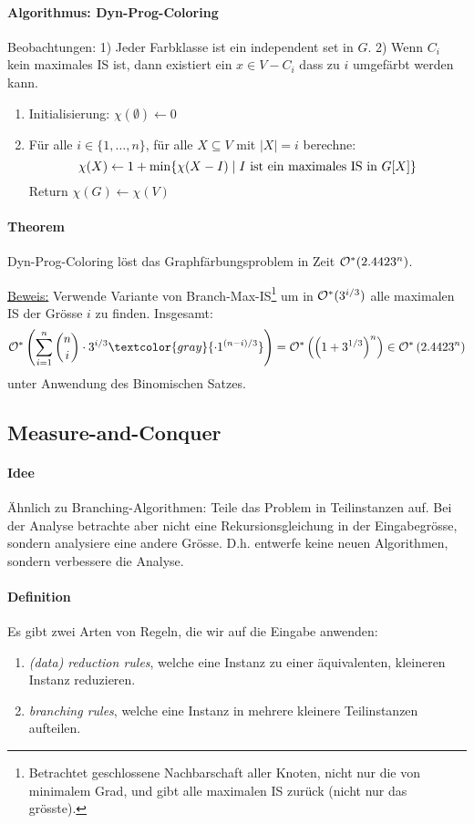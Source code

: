 \paragraph{Algorithmus: Dyn-Prog-Coloring}
Beobachtungen:
1) Jeder Farbklasse ist ein independent set in $G$.
2) Wenn $C_i$ kein maximales IS ist, dann existiert ein $x \in V-C_i$ dass zu $i$ umgefärbt werden kann.

\begin{enumerate}
    \item Initialisierung: $\chi(\emptyset) \leftarrow 0$
    \item Für alle $i \in \{1, \dots, n\}$, für alle $X \subseteq V$ mit $|X| = i$ berechne:
    $$ \chi(X) \leftarrow 1 + \min \{ \chi(X-I) \; | \; I \text{ ist ein maximales IS in } G[X] \} $$
    Return $\chi(G) \leftarrow \chi(V)$
\end{enumerate}

\paragraph{Theorem}
Dyn-Prog-Coloring löst das Graphfärbungsproblem in Zeit $\mathcal{O}^*(2.4423^n)$.

\underline{Beweis:}
Verwende Variante von Branch-Max-IS\footnote{Betrachtet geschlossene Nachbarschaft aller Knoten, nicht nur
die von minimalem Grad, und gibt alle maximalen IS zurück (nicht nur das grösste).} um in $\mathcal{O}^*(3^{i/3})$ alle maximalen IS der Grösse $i$ zu finden.
Insgesamt:
$$ \bigOstar \left(\sum_{i=1}^n \binom{n}{i} \cdot 3^{i/3} \textcolor{gray}{\cdot 1^{(n-i)/3}} \right)
= \bigOstar \left( \left(1+3^{1/3} \right)^n \right) \in \bigOstar \left(2.4423^n \right) $$
unter Anwendung des Binomischen Satzes.


\subsection{Measure-and-Conquer}

\paragraph{Idee}
Ähnlich zu Branching-Algorithmen: Teile das Problem in Teilinstanzen auf.
Bei der Analyse betrachte aber nicht eine Rekursionsgleichung in der Eingabegrösse, sondern analysiere
eine andere Grösse.
D.h. entwerfe keine neuen Algorithmen, sondern verbessere die Analyse.

\paragraph{Definition}
Es gibt zwei Arten von Regeln, die wir auf die Eingabe anwenden:
\begin{enumerate}
    \item \emph{(data) reduction rules}, welche eine Instanz zu einer äquivalenten, kleineren Instanz reduzieren.
    \item \emph{branching rules}, welche eine Instanz in mehrere kleinere Teilinstanzen aufteilen.
\end{enumerate}

